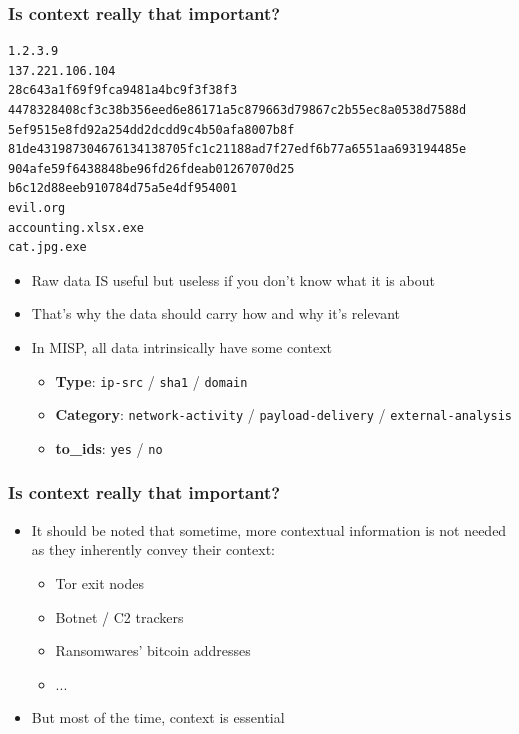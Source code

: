 \begin{frame}
    \frametitle{Is context really that important?}
\begin{lstlisting}
1.2.3.9
137.221.106.104
28c643a1f69f9fca9481a4bc9f3f38f3
4478328408cf3c38b356eed6e86171a5c879663d79867c2b55ec8a0538d7588d
5ef9515e8fd92a254dd2dcdd9c4b50afa8007b8f
81de431987304676134138705fc1c21188ad7f27edf6b77a6551aa693194485e
904afe59f6438848be96fd26fdeab01267070d25
b6c12d88eeb910784d75a5e4df954001
evil.org
accounting.xlsx.exe
cat.jpg.exe
\end{lstlisting}

    \begin{itemize}
        \item Raw data IS useful but useless if you don't know what it is about
        \item That's why the data should carry how and why it's relevant
        \item In MISP, all data intrinsically have some context
        \begin{itemize}
            \item \textbf{Type}: \texttt{ip-src} / \texttt{sha1} / \texttt{domain}
            \item \textbf{Category}: \texttt{network-activity} / \texttt{payload-delivery} / \texttt{external-analysis}
            \item \textbf{to\_ids}: \texttt{yes} / \texttt{no}
        \end{itemize}
    \end{itemize}
    
\end{frame}

\begin{frame}
    \frametitle{Is context really that important?}
    \begin{itemize}
        \item It should be noted that sometime, more contextual information is not needed as they inherently convey their context:
        \begin{itemize}
            \item Tor exit nodes
            \item Botnet / C2 trackers
            \item Ransomwares' bitcoin addresses
            \item ...
        \end{itemize}
        \item But most of the time, context is essential
    \end{itemize}
\end{frame}

